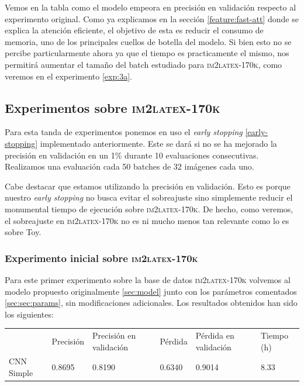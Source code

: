 \documentclass[a4paper, 20pt, dvipsnames]{article}
\begin{document}
Vemos en la tabla como el modelo empeora en precisión en validación respecto al
experimento original. Como ya explicamos en la sección \ref{feature:fast-att}
donde se explica la atención eficiente, el objetivo de esta es reducir el
consumo de memoria, uno de los principales cuellos de botella del modelo. Si
bien esto no se percibe particularmente ahora ya que el tiempo es practicamente
el mismo, nos permitirá aumentar el tamaño del batch estudiado para
\textsc{im2latex-170k}, como veremos en el experimento \ref{exp:3a}.


\subsection{Experimentos sobre \textsc{im2latex-170k}}

Para esta tanda de experimentos ponemos en uso el \emph{early stopping} \ref{early-stopping} implementado anteriormente. Este se dará si no se 
ha mejorado la precisión en validación en un 1\% durante 10 evaluaciones
consecutivas. Realizamos una evaluación cada 50 batches de 32 imágenes
cada uno.

Cabe destacar que estamos utilizando la precisión en validación. Esto es porque nuestro
\emph{early stopping} no busca evitar el sobreajuste sino simplemente reducir el
monumental tiempo de ejecución sobre \textsc{im2latex-170k}. De hecho, como veremos, el sobreajuste en
\textsc{im2latex-170k} no es ni mucho menos tan relevante como lo es sobre Toy.

\subsubsection{Experimento inicial sobre \textsc{im2latex-170k}}
\label{exp:1}

Para este primer experimento sobre la base de datos \textsc{im2latex-170k}
volvemos al modelo propuesto originalmente \ref{sec:model} junto con los
parámetros comentados \ref{sec:sec:params}, sin modificaciones adicionales. Los
resultados obtenidos han sido los siguientes:

\begin{table}[H]
	\centering
	\begin{tabular}{llllll}
		& Precisión & Precisión en validación & Pérdida & Pérdida en validación & Tiempo (h) \\ \cline{2-6} 
		CNN Simple & 0.8695    & 0.8190                  & 0.6340  & 0.9014                & 8.33      
	\end{tabular}
\end{table}
\end{document}
